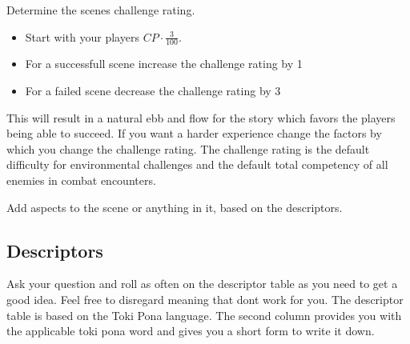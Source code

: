 \documentclass[11pt]{article}
\begin{document}
{Determine the scenes challenge rating.
\begin{itemize}
\item Start with your players \(CP \cdot \frac{3}{100}\).
\item For a successfull scene increase the challenge rating by 1
\item For a failed scene decrease the challenge rating by 3
\end{itemize}

This will result in a natural ebb and flow for the story which favors the players being able to succeed. If you want a harder experience change the factors by which you change the challenge rating. 
The challenge rating is the default difficulty for environmental challenges and the default total competency of all enemies in combat encounters.

Add aspects to the scene or anything in it, based on the descriptors.
\subsection{Descriptors}
\label{sec:orgab056dd}

Ask your question and roll as often on the descriptor table as you need to get a good idea. Feel free to disregard meaning that dont work for you.
The descriptor table is based on the Toki Pona language. The second column provides you with the applicable toki pona word and gives you a short form to write it down. 


\newpage
}
\end{document}
